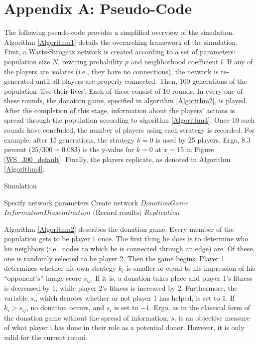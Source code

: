 \documentclass{JASSS}
\begin{document}
\section{Appendix A: Pseudo-Code}
\FloatBarrier
The following pseudo-code provides a simplified overview of the simulation. Algorithm \ref{Algorithm1} details the overarching framework of the simulation. First, a Watts-Strogatz network is created according to a set of parameters: population size $N$, rewiring probability $p$ and neighborhood coefficient $l$. If any of the players are isolates (i.e., they have no connections), the network is re-generated until all players are properly connected. Then, 100 generations of the population 'live their lives'. Each of these consist of 10 rounds. In every one of these rounds, the donation game, specified in algorithm \ref{Algorithm2}, is played. After the completion of this stage, information about the players' actions is spread through the population according to algorithm \ref{Algorithm4}. Once 10 such rounds have concluded, the number of players using each strategy is recorded. For example, after 15 generations, the strategy $k=0$ is used by 25 players. Ergo, 8.3 percent ($25/300=0.083$) is the y-value for $k=0$ at $x=15$ in Figure \ref{WS_300_default}. Finally, the players replicate, as denoted in Algorithm \ref{Algorithm4}.

\begin{algorithm}
	\caption{Simulation}
	\label{Algorithm1}
	\begin{algorithmic}[1]
		\State $\text{Specify network parameters}$
		\State $\text{Create network}$
		\State $DonationGame$
		\State $InformationDissemination$
		\EndFor
		\State $\text{(Record results)}$
		\State $Replication$
		\EndFor
		\EndFunction
	\end{algorithmic}
\end{algorithm}

Algorithm \ref{Algorithm2} describes the donation game. Every member of the population gets to be player 1 once. The first thing he does is to determine who his neighbors (i.e., nodes to which he is connected through an edge) are. Of these, one is randomly selected to be player 2. Then the game begins: Player 1 determines whether his own strategy $k_i$ is smaller or equal to his impression of his ``opponent's'' image score $s_{ij}$. If it is, a donation takes place and player 1's fitness is decreased by $1$, while player 2's fitness is increased by $2$. Furthermore, the variable $s_i$, which denotes whether or not player 1 has helped, is set to $1$. If $k_i>s_{ij}$, no donation occurs, and $s_i$ is set to $-1$. Ergo, as in the classical form of the donation game without the spread of information, $s_i$ is an objective measure of what player i has done in their role as a potential donor. However, it is only valid for the current round.
\end{document}
